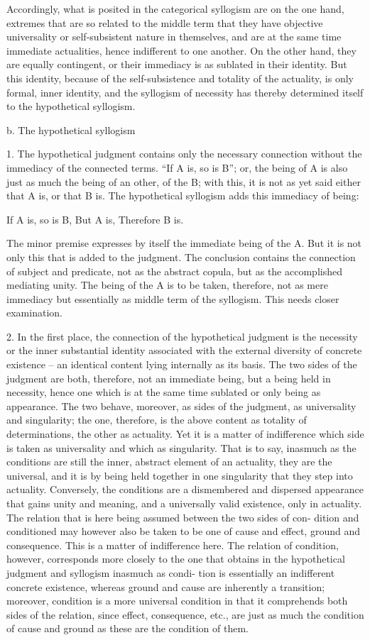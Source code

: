 Accordingly, what is posited in the categorical syllogism are
on the one hand, extremes that are so related to the middle term
that they have objective universality
or self-subsistent nature in themselves,
and are at the same time immediate actualities,
hence indifferent to one another.
On the other hand, they are equally contingent,
or their immediacy is as sublated in their identity.
But this identity, because of the self-subsistence
and totality of the actuality,
is only formal, inner identity,
and the syllogism of necessity has thereby
determined itself to the hypothetical syllogism.

b. The hypothetical syllogism

1. The hypothetical judgment contains only the necessary connection
without the immediacy of the connected terms.
“If A is, so is B”;
or, the being of A is also just as much
the being of an other, of the B;
with this, it is not as yet said either that A is, or that B is.
The hypothetical syllogism adds this immediacy of being:

If A is, so is B,
But A is,
Therefore B is.

The minor premise expresses by itself
the immediate being of the A.
But it is not only this that is added to the judgment.
The conclusion contains the connection of subject and predicate,
not as the abstract copula,
but as the accomplished mediating unity.
The being of the A is to be taken, therefore,
not as mere immediacy but essentially
as middle term of the syllogism.
This needs closer examination.

2. In the first place, the connection of the hypothetical judgment is
the necessity or the inner substantial identity associated with the external
diversity of concrete existence –
an identical content lying internally as its
basis. The two sides of the judgment are both, therefore, not an immediate
being, but a being held in necessity, hence one which is at the same time
sublated or only being as appearance. The two behave, moreover, as sides
of the judgment, as universality and singularity; the one, therefore, is the
above content as totality of determinations, the other as actuality. Yet it is
a matter of indifference which side is taken as universality and which as
singularity.
That is to say, inasmuch as the conditions are still the inner,
abstract element of an actuality, they are the universal, and it is by being
held together in one singularity that they step into actuality. Conversely, the
conditions are a dismembered and dispersed appearance that gains unity and
meaning, and a universally valid existence, only in actuality.
The relation that is here being assumed between the two sides of con-
dition and conditioned may however also be taken to be one of cause and
effect, ground and consequence.
 This is a matter of indifference here. The
relation of condition, however, corresponds more closely to the one that
obtains in the hypothetical judgment and syllogism inasmuch as condi-
tion is essentially an indifferent concrete existence, whereas ground and
cause are inherently a transition; moreover, condition
 is a more universal
condition in that it comprehends both sides of the relation, since effect,
consequence, etc., are just as much the condition of cause and ground as
these are the condition of them.

